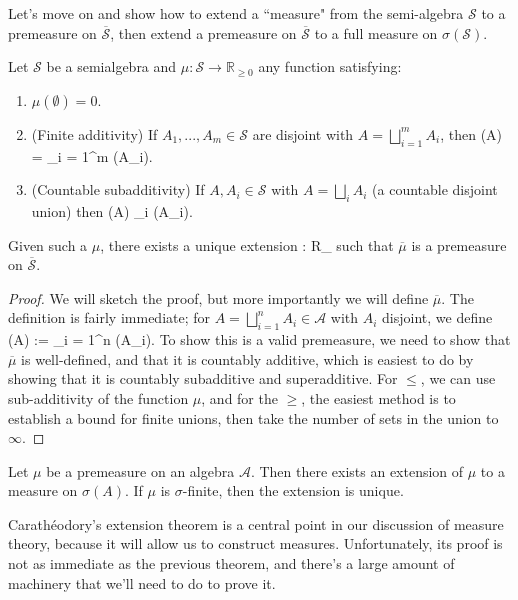 Let's move on and show how to extend a ``measure" from the semi-algebra $\mathcal S$ to a premeasure on $\overline{\mathcal S}$, then extend a premeasure on $\overline{\mathcal S}$ to a full measure on $\sigma(\mathcal S)$. 

\begin{theorem}
	Let $\mathcal S$ be a semialgebra and $\mu : \mathcal S\rightarrow\mathbb R_{\geq 0}$ any function satisfying:
	\begin{enumerate}
		\item $\mu(\emptyset) = 0$.
		\item (Finite additivity) If $A_1, ..., A_m\in\mathcal S$ are disjoint with $A = \bigsqcup_{i = 1}^m A_i$, then
		\eq
			\mu(A) = \sum_{i = 1}^m \mu(A_i).
		\qe
		\item (Countable subadditivity) If $A, A_i\in\mathcal S$ with $A = \bigsqcup_i A_i$ (a countable disjoint union) then
		\eq
			\mu(A) \leq \sum_i \mu(A_i).
		\qe
	\end{enumerate}
	Given such a $\mu$, there exists a unique extension
	\eq
		\overline{\mu} : \rightarrow\mathbb R_{}
	\qe
	such that $\overline{\mu}$ is a premeasure on $\overline{\mathcal S}$. 
\end{theorem}

\begin{proof}
	We will sketch the proof, but more importantly we will define $\overline{\mu}$. The definition is fairly immediate; for $A = \bigsqcup_{i = 1}^n A_i \in\mathcal A$ with $A_i$ disjoint, we define
	\eq
		\overline{\mu}(A) := \sum_{i = 1}^n \mu(A_i).
	\qe
	To show this is a valid premeasure, we need to show that $\overline{\mu}$ is well-defined, and that it is countably additive, which is easiest to do by showing that it is countably subadditive and superadditive. For $\leq$, we can use sub-additivity of the function $\mu$, and for the $\geq$, the easiest method is to establish a bound for finite unions, then take the number of sets in the union to $\infty$. 
\end{proof}

\begin{theorem}
	Let $\mu$ be a premeasure on an algebra $\mathcal A$. Then there exists an extension of $\mu$ to a measure on $\sigma(A)$. If $\mu$ is $\sigma$-finite, then the extension is unique.
\end{theorem}

Carath\'eodory's extension theorem is a central point in our discussion of measure theory, because it will allow us to construct measures. Unfortunately, its proof is not as immediate as the previous theorem, and there's a large amount of machinery that we'll need to do to prove it. 

